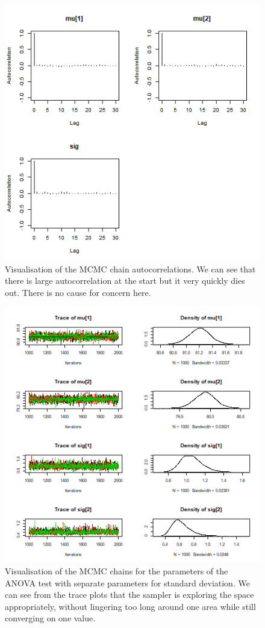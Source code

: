 \documentclass[journal, a4paper]{IEEEtran}
\begin{document}
\begin{figure}[h!]
	\includegraphics{../plots/05_autocorr.png}
	\caption{Visualisation of the MCMC chain autocorrelations. We can see that there is large autocorrelation at the start but it very quickly dies out. There
	is no cause for concern here.}
	\label{fig:5}
\end{figure}

\begin{figure}[h!]
	\includegraphics{../plots/04_chains_ANOVA_2.png}
	\caption{Visualisation of the MCMC chains for the parameters of the ANOVA test with separate parameters for standard deviation. We can see from the trace 
	plots that the sampler is exploring the space appropriately, without lingering too long around one area while still converging on one value.}
	\label{fig:6}
\end{figure}
\end{document}

